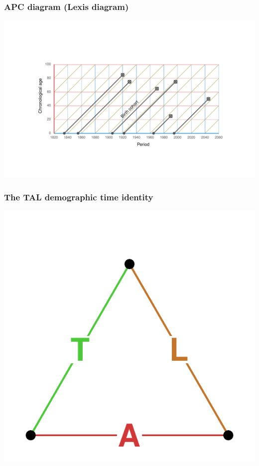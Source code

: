 \documentclass[20pt]{beamer}
\begin{document}
\begin{frame}
\frametitle{APC diagram (Lexis diagram)}
\begin{center}
\includegraphics[trim= 200 200 200 200, scale=1.5]{Figures/APCrt.pdf}
\end{center}
\end{frame}


\begin{frame}
\frametitle{The TAL demographic time identity}
\vspace{-4em}
\begin{center}
\includegraphics[scale=1.7]{Figures/TALid.pdf}
\end{center}
\end{frame}
\end{document}
